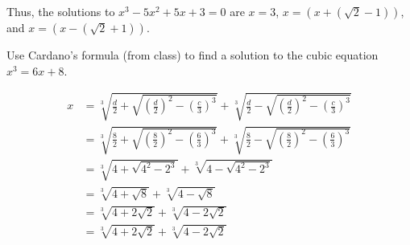 \documentclass[11pt]{article}       %
\theoremstyle{definition}
\begin{document}
    Thus, the solutions to $x^3-5x^2+5x+3=0$ are $x=3$, $x=\left(x+\left(\sqrt{2}-1\right)\right)$, and $x=\left(x-\left(\sqrt{2}+1\right)\right)$.

\newpage
{}  Use Cardano's formula (from class) to find a solution to the cubic equation $x^3=6x+8$.

    \begin{align*}
        x &= \sqrt[3]{\frac d2 + \sqrt{\left(\frac d2\right)^2 - \left(\frac c3\right)^3}} + \sqrt[3]{\frac d2 - \sqrt{\left(\frac d2\right)^2 - \left(\frac c3\right)^3}} \\
          &= \sqrt[3]{\frac 82 + \sqrt{\left(\frac 82\right)^2 - \left(\frac 63\right)^3}} + \sqrt[3]{\frac 82 - \sqrt{\left(\frac 82\right)^2 - \left(\frac 63\right)^3}} \\
          &= \sqrt[3]{4 + \sqrt{4^2 - 2^3}} + \sqrt[3]{4 - \sqrt{4^2 - 2^3}} \\
          &= \sqrt[3]{4 + \sqrt{8}} + \sqrt[3]{4 - \sqrt{8}} \\
          &= \sqrt[3]{4 + 2\sqrt{2}} + \sqrt[3]{4 - 2\sqrt{2}} \\
          &= \sqrt[3]{4 + 2\sqrt{2}} + \sqrt[3]{4 - 2\sqrt{2}}
    \end{align*}
\end{document}
